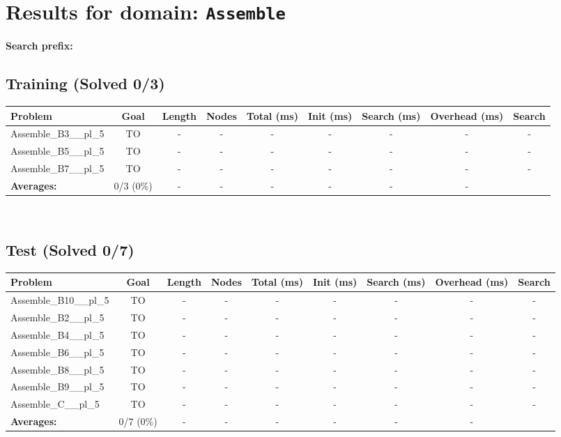 \documentclass{article}
\begin{document}
\section*{Results for domain: \texttt{Assemble}}
\textbf{Search prefix:} 
\\[0.5cm]
\subsection*{Training (Solved 0/3)}
\begin{tabular}{lcccccccc}
\toprule
Problem & Goal & Length & Nodes & Total (ms) & Init (ms) & Search (ms) & Overhead (ms) & Search \\
\midrule
Assemble\_B3\_\_pl\_5 & TO & - & - & - & - & - & - & - \\
Assemble\_B5\_\_pl\_5 & TO & - & - & - & - & - & - & - \\
Assemble\_B7\_\_pl\_5 & TO & - & - & - & - & - & - & - \\
\textbf{Averages:} & 0/3 (0\%) & - & - & - & - & - & - & \\
\bottomrule
\end{tabular}
\\[0.7cm]
\subsection*{Test (Solved 0/7)}
\begin{tabular}{lcccccccc}
\toprule
Problem & Goal & Length & Nodes & Total (ms) & Init (ms) & Search (ms) & Overhead (ms) & Search \\
\midrule
Assemble\_B10\_\_pl\_5 & TO & - & - & - & - & - & - & - \\
Assemble\_B2\_\_pl\_5 & TO & - & - & - & - & - & - & - \\
Assemble\_B4\_\_pl\_5 & TO & - & - & - & - & - & - & - \\
Assemble\_B6\_\_pl\_5 & TO & - & - & - & - & - & - & - \\
Assemble\_B8\_\_pl\_5 & TO & - & - & - & - & - & - & - \\
Assemble\_B9\_\_pl\_5 & TO & - & - & - & - & - & - & - \\
Assemble\_C\_\_pl\_5 & TO & - & - & - & - & - & - & - \\
\textbf{Averages:} & 0/7 (0\%) & - & - & - & - & - & - & \\
\bottomrule
\end{tabular}
\\[0.7cm]
\end{document}
